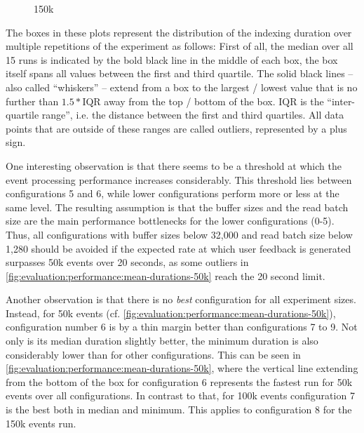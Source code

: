 \begin{figure}[h]
        \caption{150k}
        \label{fig:evaluation:performance:mean-durations-150k}
\end{figure}

The boxes in these plots represent the distribution of the indexing duration over multiple repetitions of the experiment as follows:
First of all, the median over all 15 runs is indicated by the bold black line in the middle of each box, the box itself spans all values between the first and third quartile.
The solid black lines -- also called ``whiskers'' -- extend from a box to the largest / lowest value that is no further than $ 1.5 * \text{IQR} $ away from the top / bottom of the box.
$\text{IQR}$ is the ``inter-quartile range'', i.e. the distance between the first and third quartiles.
All data points that are outside of these ranges are called outliers, represented by a plus sign.

One interesting observation is that there seems to be a threshold at which the event processing performance increases considerably.
This threshold lies between configurations 5 and 6, while lower configurations perform more or less at the same level.
The resulting assumption is that the buffer sizes and the read batch size are the main performance bottlenecks for the lower configurations (0-5).
Thus, all configurations with buffer sizes below 32,000 and read batch size below 1,280 should be avoided if the expected rate at which user feedback is generated surpasses 50k events over 20 seconds, as some outliers in \cref{fig:evaluation:performance:mean-durations-50k} reach the 20 second limit.

Another observation is that there is no \emph{best} configuration for all experiment sizes.
Instead, for 50k events (cf. \cref{fig:evaluation:performance:mean-durations-50k}), configuration number 6 is by a thin margin better than configurations 7 to 9.
Not only is its median duration slightly better, the minimum duration is also considerably lower than for other configurations.
This can be seen in \cref{fig:evaluation:performance:mean-durations-50k}, where the vertical line extending from the bottom of the box for configuration 6 represents the fastest run for 50k events over all configurations.
In contrast to that, for 100k events configuration 7 is the best both in median and minimum.
This applies to configuration 8 for the 150k events run.

